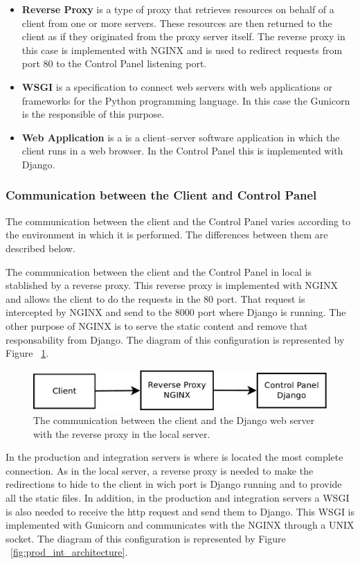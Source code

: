 \begin{itemize}
\item \textbf{Reverse Proxy} is a type of proxy that retrieves resources on behalf of a client from one or more servers. 
These resources are then returned to the client as if they originated from the proxy server itself. The reverse proxy in this case is 
implemented with NGINX and is used to redirect requests from port 80 to the Control Panel listening port.
\item \textbf{WSGI} is a specification to connect web servers with web applications or frameworks for the Python programming language. 
In this case the Gunicorn is the responsible of this purpose.
\item \textbf{Web Application} is a is a client–server software application in which the client runs in a web browser. In the Control Panel this 
is implemented with Django.
\end{itemize}

\subsubsection{Communication between the Client and Control Panel}
The communication between the client and the Control Panel varies according to the environment in which it is performed.  
The differences between them are described below.

The communication between the client and the Control Panel in local is stablished by a reverse proxy. This reverse proxy is implemented with
NGINX and allows the client to do the requests in the 80 port. That request is intercepted by NGINX and send to the 8000
port where Django is running. The other purpose of NGINX is to serve the static content and remove that responsability from Django.
The diagram of this configuration is represented by Figure ~\ref{fig:local_architecture}.

\begin{figure}[!ht]
\centering
\includegraphics[width=0.7\columnwidth]{sysadmin/images/local.pdf}
\caption{The communication between the client and the Django web server with the reverse proxy in the local server.}
\label{fig:local_architecture}
\end{figure}

In the production and integration servers is where is located the most complete connection. As in the local server, a reverse proxy is needed to 
make the redirections to hide to the client in wich port is Django running and to provide all the static files. In addition, in the production 
and integration servers a WSGI is also needed to receive the http request and send them to Django. This WSGI is implemented with Gunicorn and 
communicates with the NGINX through a UNIX socket. The diagram of this configuration is represented by Figure ~\ref{fig:prod_int_architecture}.


